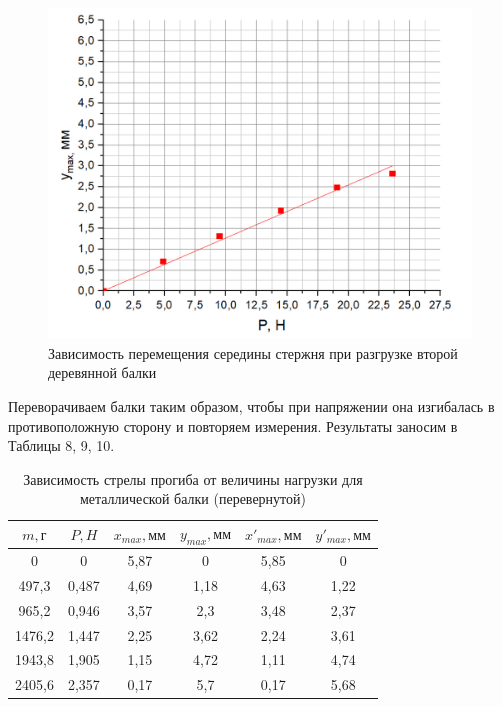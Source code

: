 \documentclass[a4paper,12pt]{article} %
\begin{document}
\begin{figure}[!h]
\centering
\includegraphics[scale=0.32]{11}
\caption{Зависимость перемещения середины стержня при разгрузке второй деревянной балки}
\end{figure}
Переворачиваем балки таким образом, чтобы при напряжении она изгибалась в противоположную сторону и повторяем измерения. Результаты заносим в Таблицы 8, 9, 10.
\begin{table}[h]
\centering
\begin{tabular}{|c|c|c|c|c|c|}
\hline
$m, \text{г}$   & $P,  H$    & $x_{max}, \text{мм}$ &  $y_{max}, \text{мм}$    & $x'_{max}, \text{мм}$ &    $y'_{max}, \text{мм}$  \\ \hline
0      & 0      & 5,87 & 0    & 5,85 & 0    \\ \hline
497,3  & 0,487  & 4,69 & 1,18 & 4,63 & 1,22 \\ \hline
965,2  & 0,946  & 3,57 & 2,3  & 3,48 & 2,37 \\ \hline
1476,2 & 1,447 & 2,25 & 3,62 & 2,24 & 3,61 \\ \hline
1943,8 & 1,905 & 1,15 & 4,72 & 1,11 & 4,74 \\ \hline
2405,6 & 2,357 & 0,17 & 5,7  & 0,17 & 5,68 \\ \hline
\end{tabular}
\caption{Зависимость стрелы прогиба от величины нагрузки для металлической балки (перевернутой)}
\end{table}
\end{document}

